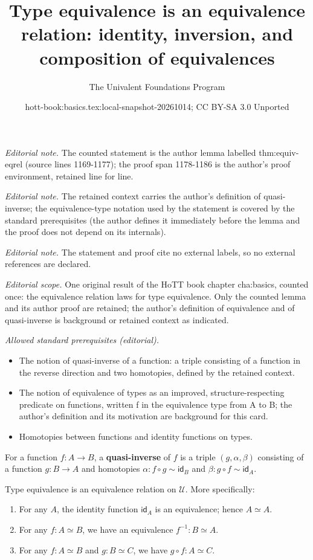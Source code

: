 \documentclass[10pt,a4paper]{article}
\title{Type equivalence is an equivalence relation: identity, inversion, and composition of equivalences}
\author{The Univalent Foundations Program}
\date{hott-book:basics.tex:local-snapshot-20261014; CC BY-SA 3.0 Unported}
\newcounter{chapter}
\providecommand{\index}[1]{}
\newcommand{\define}[1]{\textbf{#1}}
\newcommand{\idfunc}[1][]{\ensuremath{\mathsf{id}_{#1}}\xspace}
\newcommand{\htpy}{\sim}
\newcommand{\eqv}[2]{\ensuremath{#1 \simeq #2}\xspace}
\newcommand{\UU}{\ensuremath{\mathcal{U}}\xspace}
\let\type\UU
\theoremstyle{definition}
\theoremstyle{remark}
\numberwithin{equation}{section}
\newcommand{\indexdef}[1]{\index{#1|defstyle}}   %
\newcommand{\indexsee}[2]{\index{#1|see{#2}}}    %
\begin{document}
\maketitle
\noindent\textit{Editorial note.} The counted statement is the author lemma labelled thm:equiv-eqrel (source lines 1169-1177); the proof span 1178-1186 is the author's proof environment, retained line for line.\par\medskip
\noindent\textit{Editorial note.} The retained context carries the author's definition of quasi-inverse; the equivalence-type notation used by the statement is covered by the standard prerequisites (the author defines it immediately before the lemma and the proof does not depend on its internals).\par\medskip
\noindent\textit{Editorial note.} The statement and proof cite no external labels, so no external references are declared.\par\medskip
\noindent\textit{Editorial scope.} One original result of the HoTT book chapter cha:basics, counted once: the equivalence relation laws for type equivalence. Only the counted lemma and its author proof are retained; the author's definition of equivalence and of quasi-inverse is background or retained context as indicated.\par\medskip
\noindent\textit{Allowed standard prerequisites (editorial).}\begin{itemize}
\item The notion of quasi-inverse of a function: a triple consisting of a function in the reverse direction and two homotopies, defined by the retained context.
\item The notion of equivalence of types as an improved, structure-respecting predicate on functions, written f in the equivalence type from A to B; the author's definition and its motivation are background for this card.
\item Homotopies between functions and identity functions on types.
\end{itemize}\medskip
\begin{defn}\label{defn:quasi-inverse}
  For a function $f:A\to B$, a \define{quasi-inverse}
  \indexdef{quasi-inverse}%
  \indexsee{function!quasi-inverse of}{quasi-inverse}%
  of $f$ is a triple $(g,\alpha,\beta)$ consisting of a function $g:B\to A$ and homotopies
$\alpha:f\circ g\htpy \idfunc[B]$ and $\beta:g\circ f\htpy \idfunc[A]$.
\end{defn}

\begin{lem}\label{thm:equiv-eqrel}
  Type equivalence is an equivalence relation on \type.
  More specifically:
  \begin{enumerate}
  \item For any $A$, the identity function $\idfunc[A]$ is an equivalence; hence $\eqv A A$.
  \item For any $f:\eqv A B$, we have an equivalence $f^{-1} : \eqv B A$.
  \item For any $f:\eqv A B$ and $g:\eqv B C$, we have $g\circ f : \eqv A C$.
  \end{enumerate}
\end{lem}
\end{document}
